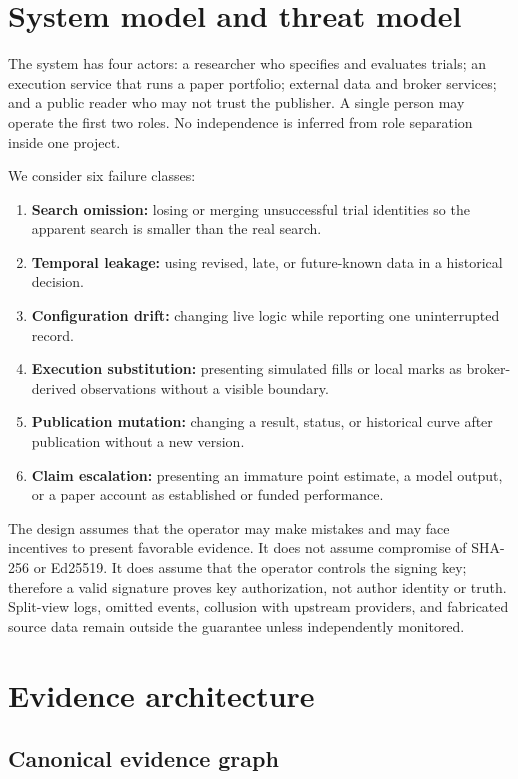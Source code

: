 \documentclass[11pt]{article}
\begin{document}
\section{System model and threat model}

The system has four actors: a researcher who specifies and evaluates trials; an execution service that runs a paper portfolio; external data and broker services; and a public reader who may not trust the publisher. A single person may operate the first two roles. No independence is inferred from role separation inside one project.

We consider six failure classes:

\begin{enumerate}
  \item \textbf{Search omission:} losing or merging unsuccessful trial identities so the apparent search is smaller than the real search.
  \item \textbf{Temporal leakage:} using revised, late, or future-known data in a historical decision.
  \item \textbf{Configuration drift:} changing live logic while reporting one uninterrupted record.
  \item \textbf{Execution substitution:} presenting simulated fills or local marks as broker-derived observations without a visible boundary.
  \item \textbf{Publication mutation:} changing a result, status, or historical curve after publication without a new version.
  \item \textbf{Claim escalation:} presenting an immature point estimate, a model output, or a paper account as established or funded performance.
\end{enumerate}

The design assumes that the operator may make mistakes and may face incentives to present favorable evidence. It does not assume compromise of SHA-256 or Ed25519. It does assume that the operator controls the signing key; therefore a valid signature proves key authorization, not author identity or truth. Split-view logs, omitted events, collusion with upstream providers, and fabricated source data remain outside the guarantee unless independently monitored.

\section{Evidence architecture}
\label{sec:graph}

\subsection{Canonical evidence graph}
\end{document}
